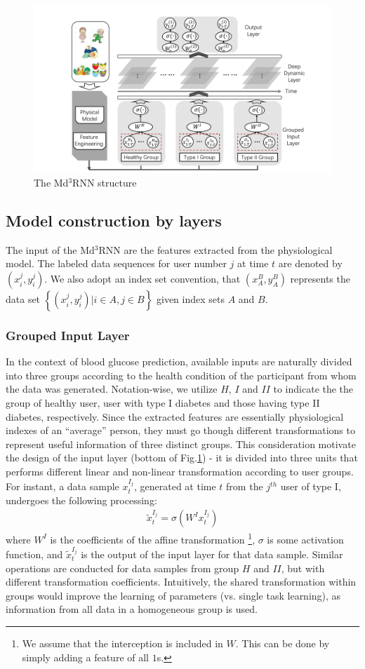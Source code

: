 \begin{figure}[!t]
  \centering
  \includegraphics[width=0.9\columnwidth]{./img/pics_RNN.pdf}
  \caption{The Md$^3$RNN structure}
  \label{fig:rnn}
\end{figure}

\subsection{Model construction by layers}
The input of the Md$^3$RNN are the features extracted from the physiological model. The labeled data sequences for user number $j$ at time $t$ are denoted by $(x_i^{j},y_i^{j})$. We also adopt an index set convention, that $(x_A^{B},y_A^B)$ represents the data set $\left\{(x_i^{j},y_i^{j}) | i \in A, j\in B\right\}$ given index sets $A$ and $B$.
\subsubsection{Grouped Input Layer}
In the context of blood glucose prediction, available inputs are naturally divided into three groups according to the health condition of the participant from whom the data was generated. Notation-wise, we utilize $H$, $I$ and $II$ to indicate the the group of healthy user, user with type I diabetes and those having type II diabetes, respectively. Since the extracted features are essentially physiological indexes of an ``average'' person, they must go though different transformations to represent useful information of three distinct groups. This consideration motivate the design of the input layer (bottom of Fig.\ref{fig:rnn}) - it is divided into three units that performs different linear and non-linear transformation according to user groups. For instant, a data sample $x_t^{I_j}$, generated at time $t$ from the $j^{th}$ user of type I, undergoes the following processing:
\begin{align}
\tilde{x}_t^{I_j} = \sigma \left( W^Ix_t^{I_j} \right)
\end{align}     
where $W^I$ is the coefficients of the affine transformation \footnote{We assume that the interception is included in $W$. This can be done by simply adding a feature of all $1$s.}, $\sigma$ is some activation function, and $\tilde{x}_t^{I_j}$ is the output of the input layer for that data sample. Similar operations are conducted for data samples from group $H$ and $II$, but with different transformation coefficients. Intuitively, the shared transformation within groups would improve the learning of parameters (vs. single task learning), as information from all data in a homogeneous group is used.  

